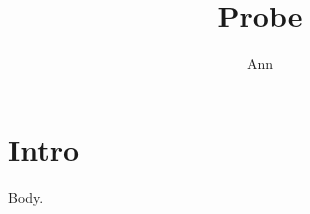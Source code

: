 \documentclass{article}
\begin{document}
\title{Probe}\author{Ann}
\maketitle
{}
\begin{otherlanguage}{french}
\end{otherlanguage}
\section{Intro}
Body.
\end{document}
